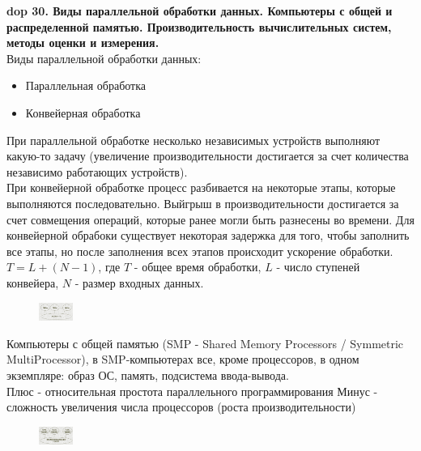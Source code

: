 \setcounter{section}{4}
\setcounter{subsection}{30}
\setcounter{equation}{0}
\textbf{\LARGE dop 30. Виды параллельной обработки данных. Компьютеры с общей и распределенной памятью. Производительность вычислительных систем, методы оценки и измерения.}\\

Виды параллельной обработки данных:
\begin{itemize}
    \item Параллельная обработка
    \item Конвейерная обработка
\end{itemize}

При параллельной обработке несколько независимых устройств выполняют какую-то задачу (увеличение производительности достигается за счет количества независимо работающих устройств).\\
При конвейерной обработке процесс разбивается на некоторые этапы, которые выполняются последовательно. Выйгрыш в производительности достигается за счет совмещения операций, которые ранее могли быть разнесены во времени. Для конвейерной обрабоки существует некоторая задержка для того, чтобы заполнить все этапы, но после заполнения всех этапов происходит ускорение обработки. $T = L + (N - 1)$, где $T$ - общее время обработки, $L$ - число ступеней конвейера, $N$ - размер входных данных.\\

\begin{figure}
    \centering
    \includegraphics[width=0.1\textwidth]{pics/smp-computer.png}
\end{figure}

Компьютеры с общей памятью (SMP - Shared Memory Processors / Symmetric MultiProcessor), в SMP-компьютерах все, кроме процессоров, в одном экземпляре: образ ОС, память, подсистема ввода-вывода.\\
Плюс - относительная простота параллельного программирования
Минус - сложность увеличения числа процессоров (роста производительности)\\


\begin{figure}
    \centering
    \includegraphics[width=0.1\textwidth]{pics/distributed-memory-computer.png}
\end{figure}

